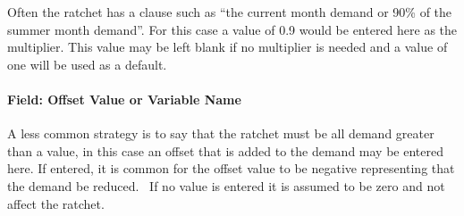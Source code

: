 Often the ratchet has a clause such as ``the current month demand or 90\% of the summer month demand''. For this case a value of 0.9 would be entered here as the multiplier. This value may be left blank if no multiplier is needed and a value of one will be used as a default.

\paragraph{Field: Offset Value or Variable Name}\label{field-offset-value-or-variable-name}

A less common strategy is to say that the ratchet must be all demand greater than a value, in this case an offset that is added to the demand may be entered here. If entered, it is common for the offset value to be negative representing that the demand be reduced.~ If no value is entered it is assumed to be zero and not affect the ratchet.